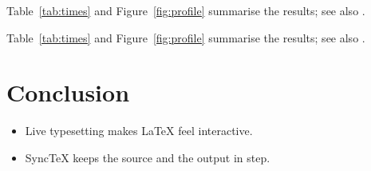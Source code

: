 \documentclass[11pt]{article}
\begin{document}
Table~\ref{tab:times} and Figure~\ref{fig:profile} summarise the results; see
also \cite{knuth1984,lamport1994}.

Table~\ref{tab:times} and Figure~\ref{fig:profile} summarise the results; see
also \cite{knuth1984,lamport1994}.


\section{Conclusion}\label{sec:conclusion}
\begin{itemize}
  \item Live typesetting makes \LaTeX{} feel interactive.
  \item SyncTeX keeps the source and the output in step.
\end{itemize}



\end{document}
